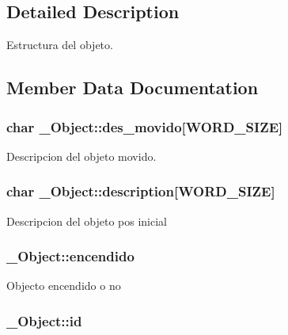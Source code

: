 \subsection{Detailed Description}
Estructura del objeto. 

\subsection{Member Data Documentation}
\hypertarget{struct__Object_a786e4c903e42b20ed785fbe4372941e0}{
\subsubsection[{des\+\_\+movido}]{\setlength{\rightskip}{0pt plus 5cm}char \+\_\+\+Object\+::des\+\_\+movido\mbox{[}{\bf W\+O\+R\+D\+\_\+\+S\+I\+Z\+E}\mbox{]}}}\label{struct__Object_a786e4c903e42b20ed785fbe4372941e0}
Descripcion del objeto movido. \hypertarget{struct__Object_a556e2e37c1461bcaae6492d2101f407d}{
\subsubsection[{description}]{\setlength{\rightskip}{0pt plus 5cm}char \+\_\+\+Object\+::description\mbox{[}{\bf W\+O\+R\+D\+\_\+\+S\+I\+Z\+E}\mbox{]}}}\label{struct__Object_a556e2e37c1461bcaae6492d2101f407d}
Descripcion del objeto pos inicial \hypertarget{struct__Object_a69dc115b72581c6618dd7c0d860d4c04}{
\subsubsection[{encendido}]{ \+\_\+\+Object\+::encendido}}\label{struct__Object_a69dc115b72581c6618dd7c0d860d4c04}
Objecto encendido o no \hypertarget{struct__Object_a3cff7a0e8dc4e9d23895ed9af1b7653a}{
\subsubsection[{id}]{ \+\_\+\+Object\+::id}}\label{struct__Object_a3cff7a0e8dc4e9d23895ed9af1b7653a}
